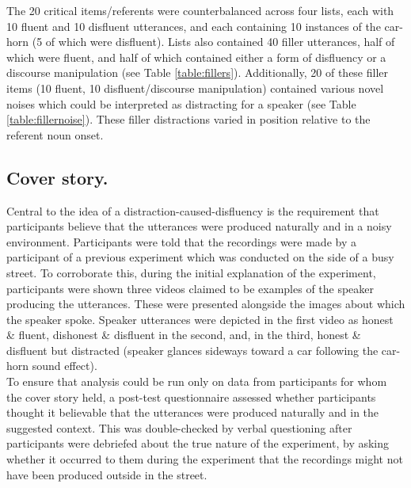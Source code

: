 \documentclass[man]{apa6}
\begin{document}
The 20 critical items/referents were counterbalanced across four lists, each with 10 fluent and 10 disfluent utterances, and each containing 10 instances of the car-horn (5 of which were disfluent). 
Lists also contained 40 filler utterances, half of which were fluent, and half of which contained either a form of disfluency or a discourse manipulation (see Table \ref{table:fillers}). 
Additionally, 20 of these filler items (10 fluent, 10 disfluent/discourse manipulation) contained various novel noises which could be interpreted as distracting for a speaker (see Table \ref{table:fillernoise}). 
These filler distractions varied in position relative to the referent noun onset. \\

\subsection{Cover story.}
Central to the idea of a distraction-caused-disfluency is the requirement that participants believe that the utterances were produced naturally and in a noisy environment. 
Participants were told that the recordings were made by a participant of a previous experiment which was conducted on the side of a busy street. 
To corroborate this, during the initial explanation of the experiment, participants were shown three videos claimed to be examples of the speaker producing the utterances. 
These were presented alongside the images about which the speaker spoke. 
Speaker utterances were depicted in the first video as honest \& fluent, dishonest \& disfluent in the second, and, in the third, honest \& disfluent but distracted (speaker glances sideways toward a car following the car-horn sound effect).\\

To ensure that analysis could be run only on data from participants for whom the cover story held, a post-test questionnaire assessed whether participants thought it believable that the utterances were produced naturally and in the suggested context. 
This was double-checked by verbal questioning after participants were debriefed about the true nature of the experiment, by asking whether it occurred to them during the experiment that the recordings might not have been produced outside in the street.\\
\end{document}
